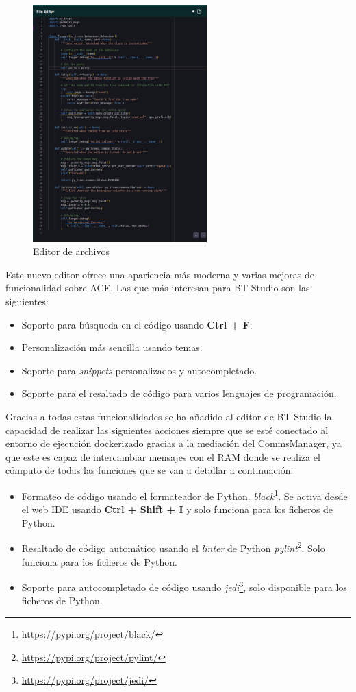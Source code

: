 \begin{figure}[H]
    \centering
    \includegraphics[width=0.6\textwidth]{figures/bt-avances/editor.png}
    \caption{Editor de archivos}
    \label{fig:bt-editor}
\end{figure}

Este nuevo editor ofrece una apariencia más moderna y varias mejoras de funcionalidad sobre ACE. Las que más interesan para BT Studio son las siguientes:

\begin{itemize}
    \item Soporte para búsqueda en el código usando \textbf{Ctrl + F}.
    \item Personalización más sencilla usando temas.
    \item Soporte para \textit{snippets} personalizados y autocompletado.
    \item Soporte para el resaltado de código para varios lenguajes de programación.
\end{itemize}

Gracias a todas estas funcionalidades se ha añadido al editor de BT Studio la capacidad de realizar las siguientes acciones siempre que se esté conectado al entorno de ejecución dockerizado gracias a la mediación del CommsManager, ya que este es capaz de intercambiar mensajes con el RAM donde se realiza el cómputo de todas las funciones que se van a detallar a continuación:

\begin{itemize}
    \item Formateo de código usando el formateador de Python. \textit{black}\footnote{\url{https://pypi.org/project/black/}}. Se activa desde el web IDE usando \textbf{Ctrl + Shift + I} y solo funciona para los ficheros de Python.
    \item Resaltado de código automático usando el \textit{linter} de Python \textit{pylint}\footnote{\url{https://pypi.org/project/pylint/}}. Solo funciona para los ficheros de Python. 
    \item Soporte para autocompletado de código usando \textit{jedi}\footnote{\url{https://pypi.org/project/jedi/}}, solo disponible para los ficheros de Python.
\end{itemize}

